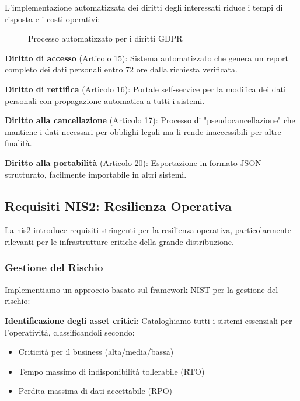 L'implementazione automatizzata dei diritti degli interessati riduce i tempi di risposta e i costi operativi:

\begin{figure}[h]
\centering
{}
\caption{Processo automatizzato per i diritti GDPR}
\label{fig:processo_diritti}
\end{figure}

\textbf{Diritto di accesso} (Articolo 15): Sistema automatizzato che genera un report completo dei dati personali entro 72 ore dalla richiesta verificata.

\textbf{Diritto di rettifica} (Articolo 16): Portale self-service per la modifica dei dati personali con propagazione automatica a tutti i sistemi.

\textbf{Diritto alla cancellazione} (Articolo 17): Processo di "pseudocancellazione" che mantiene i dati necessari per obblighi legali ma li rende inaccessibili per altre finalità.

\textbf{Diritto alla portabilità} (Articolo 20): Esportazione in formato JSON strutturato, facilmente importabile in altri sistemi.

\subsection{Requisiti NIS2: Resilienza Operativa}
\label{subsec:4.4.3_nis2}

La \gls{nis2} introduce requisiti stringenti per la resilienza operativa, particolarmente rilevanti per le infrastrutture critiche della grande distribuzione.

\subsubsection{Gestione del Rischio}

Implementiamo un approccio basato sul framework NIST per la gestione del rischio:

\textbf{Identificazione degli asset critici}: Cataloghiamo tutti i sistemi essenziali per l'operatività, classificandoli secondo:
\begin{itemize}
    \item Criticità per il business (alta/media/bassa)
    \item Tempo massimo di indisponibilità tollerabile (RTO)
    \item Perdita massima di dati accettabile (RPO)
\end{itemize}

